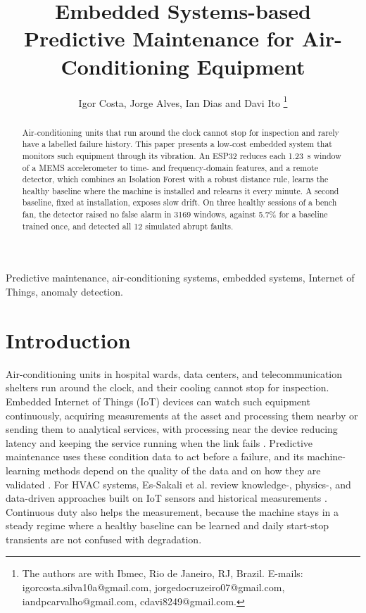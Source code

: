 \documentclass[english,hidelinks]{sbrt}
\begin{document}
\title{Embedded Systems-based Predictive Maintenance for Air-Conditioning Equipment}

\author{Igor Costa, Jorge Alves, Ian Dias and Davi Ito
  \thanks{The authors are with Ibmec, Rio de Janeiro, RJ, Brazil.
  E-mails: igorcosta.silva10a@gmail.com,
  jorgedocruzeiro07@gmail.com,
  iandpcarvalho@gmail.com,
  cdavi8249@gmail.com.}%
  }

\maketitle


\begin{abstract}
Air-conditioning units that run around the clock cannot stop for inspection and rarely have a labelled failure history. This paper presents a low-cost embedded system that monitors such equipment through its vibration. An ESP32 reduces each 1.23~s window of a MEMS accelerometer to time- and frequency-domain features, and a remote detector, which combines an Isolation Forest with a robust distance rule, learns the healthy baseline where the machine is installed and relearns it every minute. A second baseline, fixed at installation, exposes slow drift. On three healthy sessions of a bench fan, the detector raised no false alarm in 3169 windows, against 5.7\% for a baseline trained once, and detected all 12 simulated abrupt faults.
\end{abstract}
\begin{keywords}
Predictive maintenance, air-conditioning systems, embedded systems, Internet of Things, anomaly detection.
\end{keywords}

\section{Introduction}

Air-conditioning units in hospital wards, data centers, and telecommunication shelters run around the clock, and their cooling cannot stop for inspection. Embedded Internet of Things (IoT) devices can watch such equipment continuously, acquiring measurements at the asset and processing them nearby or sending them to analytical services, with processing near the device reducing latency and keeping the service running when the link fails \cite{gubbi2013iot,lin2017iot}. Predictive maintenance uses these condition data to act before a failure, and its machine-learning methods depend on the quality of the data and on how they are validated \cite{carvalho2019mlpdm}. For HVAC systems, Es-Sakali et al. review knowledge-, physics-, and data-driven approaches built on IoT sensors and historical measurements \cite{essakali2022hvac}. Continuous duty also helps the measurement, because the machine stays in a steady regime where a healthy baseline can be learned and daily start-stop transients are not confused with degradation.
\end{document}
